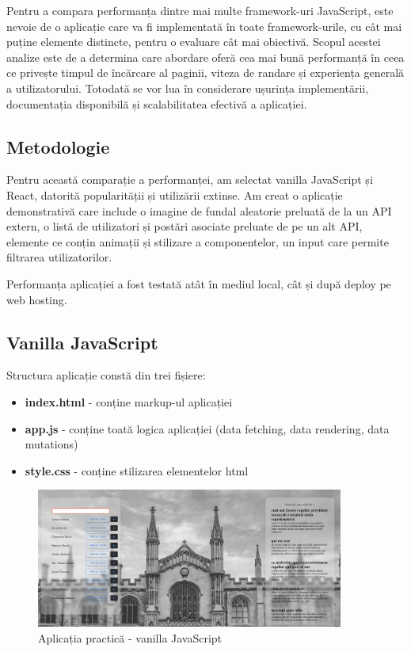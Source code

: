 \documentclass[12pt, a4paper]{report}
\begin{document}
Pentru a compara performanța dintre mai multe framework-uri JavaScript, este nevoie de o aplicație care va fi implementată în toate framework-urile, cu cât mai puține elemente distincte, pentru o evaluare cât mai obiectivă. Scopul acestei analize este de a determina care abordare oferă cea mai bună performanță în ceea ce privește timpul de încărcare al paginii, viteza de randare și experiența generală a utilizatorului. Totodată se vor lua în considerare ușurința implementării, documentația disponibilă și scalabilitatea efectivă a aplicației.

\subsection{Metodologie}

Pentru această comparație a performanței, am selectat vanilla JavaScript și React, datorită popularității și utilizării extinse. Am creat o aplicație demonstrativă care include o imagine de fundal aleatorie preluată de la un API extern, o listă de utilizatori și postări asociate preluate de pe un alt API, elemente ce conțin animații și stilizare a componentelor, un input care permite filtrarea utilizatorilor.

Performanța aplicației a fost testată atât în mediul local, cât și după deploy pe web hosting.

\subsection{Vanilla JavaScript}
Structura aplicație constă din trei fișiere:
\begin{itemize}
	\item \textbf{index.html} - conține markup-ul aplicației
	\item \textbf{app.js} - conține toată logica aplicației (data fetching, data rendering, data mutations)
	\item \textbf{style.css} - conține stilizarea elementelor html
\end{itemize}

\begin{figure}[htbp]
	\centering
	\includegraphics[width=0.9\textwidth]{01_desktop_preview.png}
	\caption{Aplicația practic\u a - vanilla JavaScript}
	\label{fig:preview-vanillajs}
\end{figure}
\end{document}
